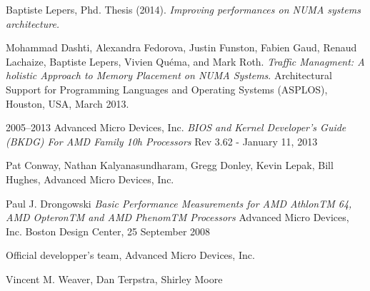 \newpage
\begin{thebibliography}{99}

   Baptiste Lepers, Phd. Thesis (2014).
    \newblock \textit{Improving performances on NUMA systems architecture.}
  
   Mohammad Dashti, Alexandra Fedorova, Justin Funston,
    Fabien Gaud, Renaud Lachaize, Baptiste Lepers, Vivien Quéma, and Mark
    Roth.
    \newblock \textit{Traffic Managment: A holistic Approach to Memory
      Placement on NUMA Systems}.
    \newblock Architectural Support for Programming Languages and Operating
    Systems (ASPLOS), Houston, USA, March 2013.

   2005–2013 Advanced Micro Devices, Inc.
  	\newblock \textit{BIOS and Kernel Developer’s Guide (BKDG) For AMD Family 10h Processors}
  	Rev 3.62  - January 11, 2013

  Pat Conway, Nathan Kalyanasundharam, Gregg Donley, Kevin Lepak, Bill Hughes, Advanced Micro Devices, Inc.

  Paul J. Drongowski
  	\newblock \textit{Basic Performance Measurements for AMD AthlonTM 64, AMD OpteronTM and AMD PhenomTM Processors}
  	Advanced Micro Devices, Inc. Boston Design Center, 25 September 2008

  Official developper's team, Advanced Micro Devices, Inc.

  Vincent M. Weaver, Dan Terpstra, Shirley Moore

  


\end{thebibliography}
